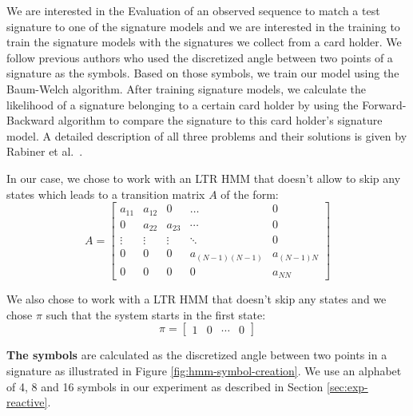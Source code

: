 \documentclass[a4paper, oneside]{csthesis}
\begin{document}
We are interested in the Evaluation of an observed sequence to match a test signature to one of the signature models and we are interested in the training to train the signature models with the signatures we collect from a card holder. We follow previous authors who used the discretized angle between two points of a signature as the symbols. Based on those symbols, we train our model using the Baum-Welch algorithm. After training signature models, we calculate the likelihood of a signature belonging to a certain card holder by using the Forward-Backward algorithm to compare the signature to this card holder's signature model. A detailed description of all three problems and their solutions is given by Rabiner et al.~\cite{rabiner1989tutorial}.

In our case, we chose to work with an LTR HMM that doesn't allow to skip any states which leads to a transition matrix $A$ of the form:
\begin{equation}
A = \left[\begin{array}{ccccc}a_{11} & a_{12} & 0 & \hdots & 0 \\0 & a_{22} & a_{23} & \cdots & 0 \\\vdots & \vdots & \vdots & \ddots & 0 \\0 & 0 & 0 & a_{(N-1)(N-1)} & a_{(N-1)N} \\0 & 0 & 0 & 0 & a_{NN}\end{array}\right]
\label{eq:hmm-transition-matrix}
\end{equation}


We also chose to work with a LTR HMM that doesn't skip any states and we chose $\pi$ such that the system starts in the first state:
$$\pi = \left[\begin{array}{cccc}1 & 0 & \cdots & 0\end{array}\right]$$


\textbf{The symbols} are calculated as the discretized angle between two points in a signature as illustrated in Figure \ref{fig:hmm-symbol-creation}. We use an alphabet of 4, 8 and 16 symbols in our experiment as described in Section \ref{sec:exp-reactive}.
\end{document}
